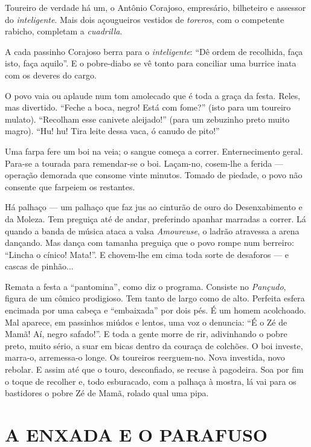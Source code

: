 Toureiro de verdade há um, o Antônio Corajoso, empresário, bilheteiro e
assessor do \emph{inteligente}. Mais dois açougueiros vestidos de
\emph{toreros}, com o competente rabicho, completam a \emph{cuadrilla}.

A cada passinho Corajoso berra para o \emph{inteligente}: ``Dê ordem de
recolhida, faça isto, faça aquilo''. E o pobre-diabo se vê tonto para
conciliar uma burrice inata com os deveres do cargo.

O povo vaia ou aplaude num tom amolecado que é toda a graça da festa.
Reles, mas divertido. ``Feche a boca, negro! Está com fome?'' (isto para
um toureiro mulato). ``Recolham esse canivete aleijado!'' (para um
zebuzinho preto muito magro). ``Hu! hu! Tira leite dessa vaca, ó canudo
de pito!''

Uma farpa fere um boi na veia; o sangue começa a correr. Enternecimento
geral. Para-se a tourada para remendar-se o boi. Laçam-no, cosem-lhe a
ferida --- operação demorada que consome vinte minutos. Tomado de
piedade, o povo não consente que farpeiem os restantes.

Há palhaço --- um palhaço que faz jus ao cinturão de ouro do
Desenxabimento e da Moleza. Tem preguiça até de andar, preferindo
apanhar marradas a correr. Lá quando a banda de música ataca a valsa
\emph{Amoureuse}, o ladrão atravessa a arena dançando. Mas dança com
tamanha preguiça que o povo rompe num berreiro: ``Lincha o cínico!
Mata!''. E chovem-lhe em cima toda sorte de desaforos --- e cascas de
pinhão...

Remata a festa a ``pantomina'', como diz o programa. Consiste no
\emph{Pançudo}, figura de um cômico prodigioso. Tem tanto de largo como
de alto. Perfeita esfera encimada por uma cabeça e ``embaixada'' por
dois pés. É um homem acolchoado. Mal aparece, em passinhos miúdos e
lentos, uma voz o denuncia: ``É o Zé de Mamã! Aí, negro safado!''. E
toda a gente morre de rir, adivinhando o pobre preto, muito sério, a
suar em bicas dentro da couraça de colchões. O boi investe, marra-o,
arremessa-o longe. Os toureiros reerguem-no. Nova investida, novo
rebolar. E assim até que o touro, desconfiado, se recuse à pagodeira.
Soa por fim o toque de recolher e, todo esburacado, com a palhaça à
mostra, lá vai para os bastidores o pobre Zé de Mamã, rolado qual uma
pipa.

\section{A ENXADA E O PARAFUSO}

